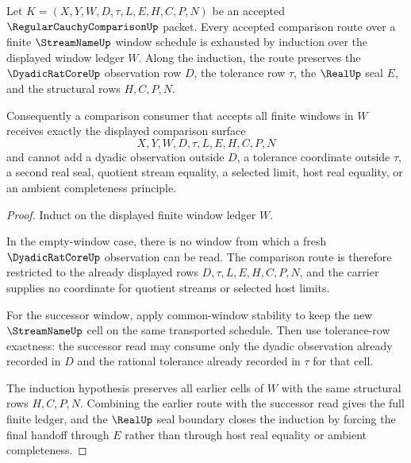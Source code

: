 \begin{theorem}
\label{thm:regular-cauchy-comparison-finite-window-induction}
Let $K=(X,Y,W,D,\tau,L,E,H,C,P,N)$ be an accepted $\RegularCauchyComparisonUp$ packet. Every accepted comparison route over a finite $\StreamNameUp$ window schedule is exhausted by induction over the displayed window ledger $W$. Along the induction, the route preserves the $\DyadicRatCoreUp$ observation row $D$, the tolerance row $\tau$, the $\RealUp$ seal $E$, and the structural rows $H,C,P,N$.

Consequently a comparison consumer that accepts all finite windows in $W$ receives exactly the displayed comparison surface
$$
X,Y,W,D,\tau,L,E,H,C,P,N
$$
and cannot add a dyadic observation outside $D$, a tolerance coordinate outside $\tau$, a second real seal, quotient stream equality, a selected limit, host real equality, or an ambient completeness principle.
\end{theorem}
\begin{proof}
Induct on the displayed finite window ledger $W$.

In the empty-window case, there is no window from which a fresh $\DyadicRatCoreUp$ observation can be read. The comparison route is therefore restricted to the already displayed rows $D,\tau,L,E,H,C,P,N$, and the carrier supplies no coordinate for quotient streams or selected host limits.

For the successor window, apply common-window stability to keep the new $\StreamNameUp$ cell on the same transported schedule. Then use tolerance-row exactness: the successor read may consume only the dyadic observation already recorded in $D$ and the rational tolerance already recorded in $\tau$ for that cell.

The induction hypothesis preserves all earlier cells of $W$ with the same structural rows $H,C,P,N$. Combining the earlier route with the successor read gives the full finite ledger, and the $\RealUp$ seal boundary closes the induction by forcing the final handoff through $E$ rather than through host real equality or ambient completeness.
\end{proof}

